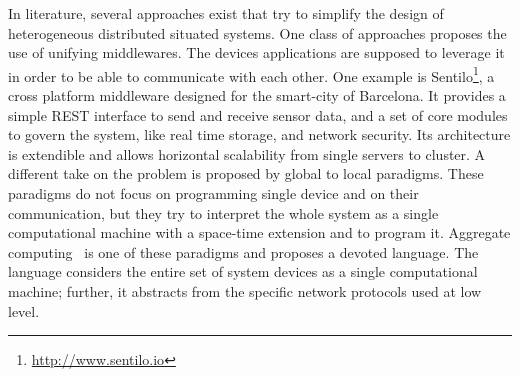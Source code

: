 In literature, several approaches exist that try to simplify the design of heterogeneous distributed situated systems.
One class of approaches proposes the use of unifying middlewares.
The devices applications are supposed to leverage it in order to be able to communicate with each other. 
One example is Sentilo\footnote{\href{http://www.sentilo.io}{http://www.sentilo.io}}, a cross platform middleware designed for the smart-city of Barcelona.
It provides a simple REST interface to send and receive sensor data, and a set of core modules to govern the system, like real time storage, and network security. 
Its architecture is extendible and allows horizontal scalability from single servers to cluster.
A different take on the problem is proposed by global to local paradigms.
These paradigms do not focus on programming single device and on their communication, but they try to interpret the whole system as a single computational machine with a space-time extension and to program it.
Aggregate computing~\cite{BealIEEEComputer2015} is one of these paradigms and proposes a devoted language.
The language considers the entire set of system devices as a single computational machine; further, it abstracts from the specific network protocols used at low level.

